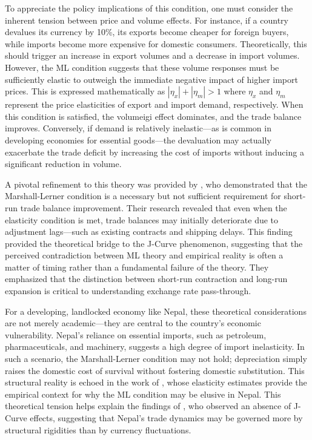 \documentclass[12pt]{article}
\begin{document}
To appreciate the policy implications of this condition, one must consider the inherent tension between price and volume effects. For instance, if a country devalues its currency by 10\%, its exports become cheaper for foreign buyers, while imports become more expensive for domestic consumers. Theoretically, this should trigger an increase in export volumes and a decrease in import volumes. However, the ML condition suggests that these volume responses must be sufficiently elastic to outweigh the immediate negative impact of higher import prices. This is expressed mathematically as $|\eta_x| + |\eta_m| > 1$  where $\eta_x$ and $\eta_m$ represent the price elasticities of export and import demand, respectively. When this condition is satisfied, the volumeigi effect dominates, and the trade balance improves. Conversely, if demand is relatively inelastic—as is common in developing economies for essential goods—the devaluation may actually exacerbate the trade deficit by increasing the cost of imports without inducing a significant reduction in volume.

A pivotal refinement to this theory was provided by \textcite{Rose1989-bs}, who demonstrated that the Marshall-Lerner condition is a necessary but not sufficient requirement for short-run trade balance improvement. Their research revealed that even when the elasticity condition is met, trade balances may initially deteriorate due to adjustment lags—such as existing contracts and shipping delays. This finding provided the theoretical bridge to the J-Curve phenomenon, suggesting that the perceived contradiction between ML theory and empirical reality is often a matter of timing rather than a fundamental failure of the theory. They emphasized that the distinction between short-run contraction and long-run expansion is critical to understanding exchange rate pass-through.

For a developing, landlocked economy like Nepal, these theoretical considerations are not merely academic—they are central to the country's economic vulnerability. Nepal’s reliance on essential imports, such as petroleum, pharmaceuticals, and machinery, suggests a high degree of import inelasticity. In such a scenario, the Marshall-Lerner condition may not hold; depreciation simply raises the domestic cost of survival without fostering domestic substitution. This structural reality is echoed in the work of \textcite{pathak2020}, whose elasticity estimates provide the empirical context for why the ML condition may be elusive in Nepal. This theoretical tension helps explain the findings of \textcite{chaulagai2015}, who observed an absence of J-Curve effects, suggesting that Nepal's trade dynamics may be governed more by structural rigidities than by currency fluctuations.
\end{document}
